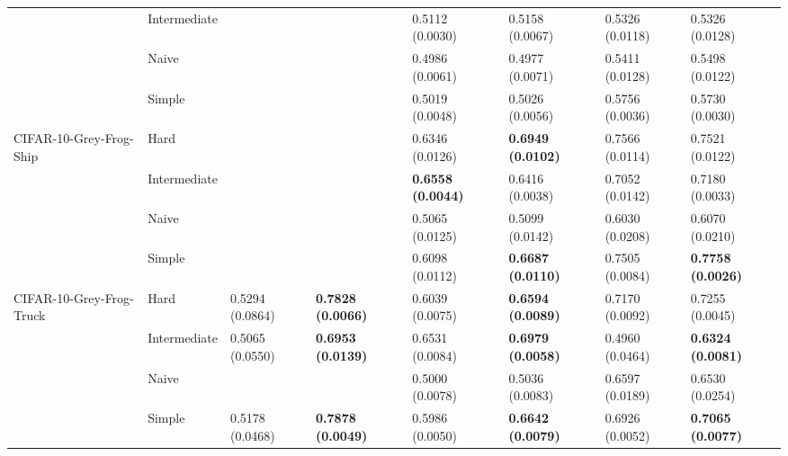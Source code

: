 \begin{tabular}{llllllll}
                 & Intermediate &                           &                           &           0.5112 (0.0030) &           0.5158 (0.0067) &           0.5326 (0.0118) &           0.5326 (0.0128) \\
                 & Naive &                           &                           &           0.4986 (0.0061) &           0.4977 (0.0071) &           0.5411 (0.0128) &           0.5498 (0.0122) \\
                 & Simple &                           &                           &           0.5019 (0.0048) &           0.5026 (0.0056) &           0.5756 (0.0036) &           0.5730 (0.0030) \\
CIFAR-10-Grey-Frog-Ship & Hard &                           &                           &           0.6346 (0.0126) &  \textbf{0.6949 (0.0102)} &           0.7566 (0.0114) &           0.7521 (0.0122) \\
                 & Intermediate &                           &                           &  \textbf{0.6558 (0.0044)} &           0.6416 (0.0038) &           0.7052 (0.0142) &           0.7180 (0.0033) \\
                 & Naive &                           &                           &           0.5065 (0.0125) &           0.5099 (0.0142) &           0.6030 (0.0208) &           0.6070 (0.0210) \\
                 & Simple &                           &                           &           0.6098 (0.0112) &  \textbf{0.6687 (0.0110)} &           0.7505 (0.0084) &  \textbf{0.7758 (0.0026)} \\
CIFAR-10-Grey-Frog-Truck & Hard &           0.5294 (0.0864) &  \textbf{0.7828 (0.0066)} &           0.6039 (0.0075) &  \textbf{0.6594 (0.0089)} &           0.7170 (0.0092) &           0.7255 (0.0045) \\
                 & Intermediate &           0.5065 (0.0550) &  \textbf{0.6953 (0.0139)} &           0.6531 (0.0084) &  \textbf{0.6979 (0.0058)} &           0.4960 (0.0464) &  \textbf{0.6324 (0.0081)} \\
                 & Naive &                           &                           &           0.5000 (0.0078) &           0.5036 (0.0083) &           0.6597 (0.0189) &           0.6530 (0.0254) \\
                 & Simple &           0.5178 (0.0468) &  \textbf{0.7878 (0.0049)} &           0.5986 (0.0050) &  \textbf{0.6642 (0.0079)} &           0.6926 (0.0052) &  \textbf{0.7065 (0.0077)} \\

\end{tabular}
